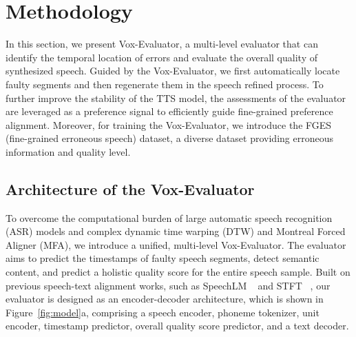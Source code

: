 \documentclass[letterpaper]{article} %
\begin{document}
\section{Methodology}
In this section, we present Vox-Evaluator, a multi-level evaluator that can identify the temporal location of errors and evaluate the overall quality of synthesized speech.
Guided by the Vox-Evaluator, we first automatically locate faulty segments and then regenerate them in the speech refined process. To further improve the stability of the TTS model, the assessments of the evaluator are leveraged as a preference signal to efficiently guide fine-grained preference alignment. Moreover, for training the Vox-Evaluator, we introduce the FGES (fine-grained erroneous speech) dataset, a diverse dataset providing erroneous information and quality level.


\subsection{Architecture of the Vox-Evaluator}
To overcome the computational burden of large automatic speech recognition (ASR) models and complex dynamic time warping (DTW) and Montreal Forced Aligner (MFA), we introduce a unified, multi-level Vox-Evaluator. The evaluator aims to predict the timestamps of faulty speech segments, detect semantic content, and predict a holistic quality score for the entire speech sample. Built on previous speech-text alignment works, such as SpeechLM ~\cite{zhang2024speechlm} and STFT ~\cite{tang2022unified}, our evaluator is designed as an encoder-decoder architecture, which is shown in Figure~\ref{fig:model}a, comprising a speech encoder, phoneme tokenizer, unit encoder, timestamp predictor, overall quality score predictor, and a text decoder.
\end{document}
